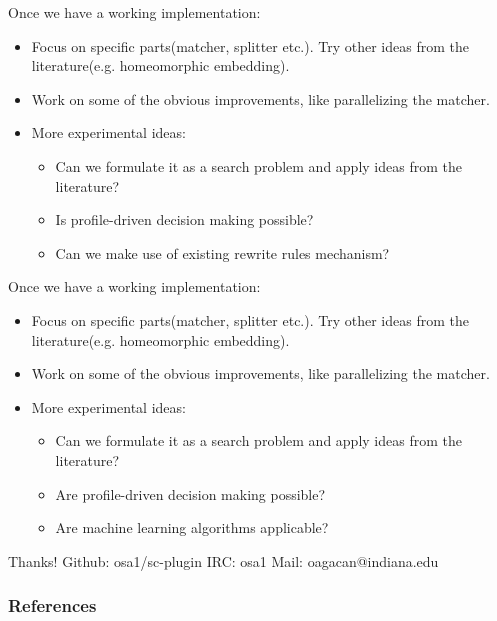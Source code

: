 \documentclass{beamer}
\begin{document}
\begin{frame}
    Once we have a working implementation:
    \begin{itemize}
        \item
            Focus on specific parts(matcher, splitter etc.). Try other
            ideas from the literature(e.g. homeomorphic embedding).
        \item
            Work on some of the obvious improvements, like parallelizing
            the matcher.
        \item
            More experimental ideas:
            \begin{itemize}
                \item[]
                    Can we formulate it as a search problem and apply
                    ideas from the literature?
                \item[]
                    Is profile-driven decision making possible?
                \item[]
                    Can we make use of existing rewrite rules mechanism?
            \end{itemize}
    \end{itemize}
\end{frame}

\begin{frame}
    Once we have a working implementation:
    \begin{itemize}
        \item
            Focus on specific parts(matcher, splitter etc.). Try other
            ideas from the literature(e.g. homeomorphic embedding).
        \item
            Work on some of the obvious improvements, like parallelizing
            the matcher.
        \item
            More experimental ideas:
            \begin{itemize}
                \item[]
                    Can we formulate it as a search problem and apply
                    ideas from the literature?
                \item[]
                    Are profile-driven decision making possible?
                \item[]
                    Are machine learning algorithms applicable?
            \end{itemize}
    \end{itemize}

    \bigskip
    Thanks!
    \newline
    Github: osa1/sc-plugin \hspace{0.3cm} IRC: osa1 \hspace{0.3cm} Mail:
    oagacan@indiana.edu
\end{frame}

\begin{frame}[allowframebreaks]
    \frametitle{References}

    
    
\end{frame}
\end{document}
